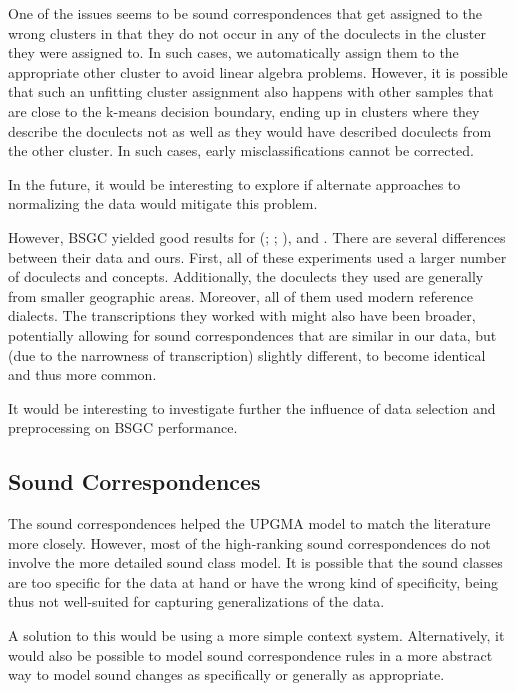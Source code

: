 \documentclass[a4paper]{article}
\begin{document}
One of the issues seems to be
sound correspondences that get assigned to the wrong clusters
in that they do not occur in any of the doculects in the cluster
they were assigned to.
In such cases, we automatically assign them to the appropriate
other cluster to avoid linear algebra problems.
However, it is possible that such an unfitting
cluster assignment also happens with other samples
that are close to the k-means decision boundary,
ending up in clusters where they describe the doculects
not as well as they would have described doculects from the other cluster.
In such cases, early misclassifications cannot be corrected.

In the future, it would be interesting to
explore if alternate approaches to normalizing the data
would mitigate this problem.

However, BSGC yielded good results for \citeauthor{wieling2011bipartite}
(\citeyear{wieling2009bipartite}; \citeyear{wieling2010hierarchical}; \citeyear{wieling2011bipartite}),
\citet{wieling2013analyzing} and \citet{montemagni2013synchronic}.
There are several differences between their data and ours.
First, all of these experiments used a larger number
of doculects and concepts.
Additionally, the doculects they used are
generally from smaller geographic areas.
Moreover, all of them used modern reference dialects.
The transcriptions they worked with might also have been broader,
potentially allowing for sound correspondences that are similar in our data,
but (due to the narrowness of transcription) slightly different,
to become identical and thus more common.

It would be interesting to investigate further the influence of
data selection and preprocessing on BSGC performance.

\subsection{Sound Correspondences}

The sound correspondences helped the UPGMA model
to match the literature more closely.
However, most of the high-ranking sound correspondences
do not involve the more detailed sound class model.
It is possible that the sound classes are too specific
for the data at hand or have the wrong kind of specificity,
being thus not well-suited for capturing generalizations of the data.

A solution to this would be using a more simple context system.
Alternatively, it would also be possible to model sound correspondence
rules in a more abstract way to model sound changes
as specifically or generally as appropriate.
\end{document}
